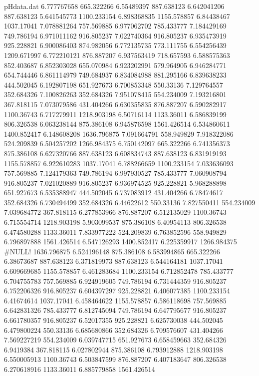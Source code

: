 \begin{filecontents}{pHdata.dat}
6.777767658	665.322266
6.55489397	887.638123
6.642041206	887.638123
5.641545773	1100.233154
6.898368835	1155.578857
6.84438467	1037.17041
7.078881264	757.569885
6.977062702	785.433777
7.184429169	749.786194
6.971011162	916.805237
7.022740364	916.805237
6.935473919	925.228821
6.900086403	874.982056
6.772135735	773.111755
6.554256439	1209.671997
6.772210121	876.887207
6.937563419	718.657593
6.588575363	852.403687
6.852303028	655.070984
6.923202991	579.964905
6.946284771	654.744446
6.861114979	749.684937
6.834084988	881.295166
6.839638233	444.502045
6.192807198	651.927673
6.700853348	550.33136
7.129764557	352.684326
7.100826263	352.684326
7.951078415	554.234009
7.193216801	367.818115
7.073079586	431.404266
6.630355835	876.887207
6.590282917	1100.36743
6.717279911	1218.903198
6.50716114	1133.36011
6.586839199	806.326538
6.063238144	875.386108
6.945876598	1561.426514
6.534860611	1400.852417
6.148608208	1636.796875
7.091664791	558.949829
7.918322086	524.209839
6.504257202	1266.984375
6.750142097	665.322266
6.741356373	875.386108
6.627320766	887.638123
6.608834743	887.638123
6.831919193	1155.578857
6.922610283	1037.17041
6.788266659	1100.233154
7.033636093	757.569885
7.124179363	749.786194
6.997930527	785.433777
7.060908794	916.805237
7.021020889	916.805237
6.936974525	925.228821
5.968288898	651.927673
6.535388947	444.502045
6.737083912	431.404266
6.78474617	352.684326
6.730494499	352.684326
6.44622612	550.33136
7.827550411	554.234009
7.039684772	367.818115
6.277853966	876.887207
6.512135029	1100.36743
6.715554714	1218.903198
5.903099537	875.386108
6.40954113	806.326538
6.474580288	1133.36011
7.833977222	524.209839
6.763852596	558.949829
6.796897888	1561.426514
6.547126293	1400.852417
6.225359917	1266.984375
#NULL!	1636.796875
6.524196148	875.386108
6.583994865	665.322266
6.38673687	887.638123
6.371819973	887.638123
6.544164181	1037.17041
6.609669685	1155.578857
6.461283684	1100.233154
6.712852478	785.433777
6.704755783	757.569885
6.924919605	749.786194
6.731444359	916.805237
6.752206326	916.805237
6.604397297	925.228821
6.406077385	1100.233154
6.41674614	1037.17041
6.458464622	1155.578857
6.586118698	757.569885
6.642831326	785.433777
6.812745094	749.786194
6.647795677	916.805237
6.661780357	916.805237
6.52017355	925.228821
6.625730038	444.502045
6.479800224	550.33136
6.685680866	352.684326
6.709576607	431.404266
7.569227219	554.234009
6.039747715	651.927673
6.658459663	352.684326
6.9419384	367.818115
6.027802944	875.386108
6.793912888	1218.903198
6.550005913	1100.36743
6.503847599	876.887207
6.407183647	806.326538
6.270618916	1133.36011
6.885779858	1561.426514

\end{filecontents}
